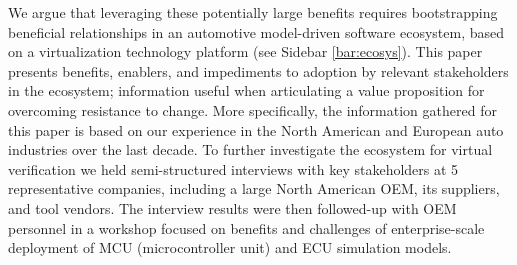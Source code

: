 
We argue that leveraging these potentially large benefits requires bootstrapping beneficial relationships in an automotive model-driven software ecosystem, based on a virtualization technology platform (see Sidebar \ref{bar:ecosys}). 
This paper presents benefits, enablers, and impediments to adoption by relevant stakeholders in the ecosystem; information useful when articulating a value proposition for overcoming  resistance to change.
More specifically, the information gathered for this paper is based on our experience in the North American and European auto industries over the last decade.
To further investigate the ecosystem for virtual verification we held semi-structured interviews with key stakeholders at 5 representative companies, including a large North American OEM, its suppliers, and tool vendors.
The interview results were then followed-up with OEM personnel in a workshop focused on benefits and challenges of enterprise-scale deployment of MCU (microcontroller unit) and ECU simulation models.

